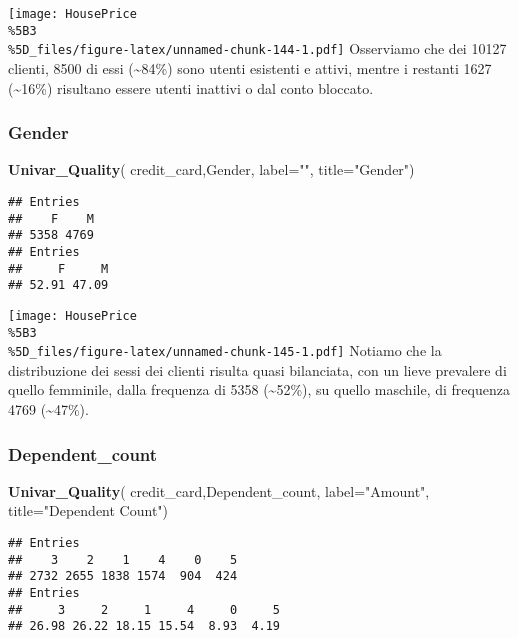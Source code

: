 \documentclass[
]{article}
\newenvironment{Shaded}{\begin{snugshade}}{\end{snugshade}}
\newcommand{\AttributeTok}[1]{\textcolor[rgb]{0.13,0.29,0.53}{#1}}
\newcommand{\FunctionTok}[1]{\textcolor[rgb]{0.13,0.29,0.53}{\textbf{#1}}}
\newcommand{\NormalTok}[1]{#1}
\newcommand{\StringTok}[1]{\textcolor[rgb]{0.31,0.60,0.02}{#1}}
\begin{document}
\texttt{[image: HousePrice\\\%5B3\\\%5D\_files/figure-latex/unnamed-chunk-144-1.pdf]}
Osserviamo che dei 10127 clienti, 8500 di essi (\textasciitilde84\%)
sono utenti esistenti e attivi, mentre i restanti 1627
(\textasciitilde16\%) risultano essere utenti inattivi o dal conto
bloccato.

\subsubsection{Gender}\label{gender}

\begin{Shaded}
\begin{Highlighting}[]
\FunctionTok{Univar\_Quality}\NormalTok{(}
\NormalTok{  credit\_card,Gender,}
  \AttributeTok{label=}\StringTok{""}\NormalTok{,}
  \AttributeTok{title=}\StringTok{"Gender"}\NormalTok{)}
\end{Highlighting}
\end{Shaded}

\begin{verbatim}
## Entries
##    F    M 
## 5358 4769 
## Entries
##     F     M 
## 52.91 47.09
\end{verbatim}

\texttt{[image: HousePrice\\\%5B3\\\%5D\_files/figure-latex/unnamed-chunk-145-1.pdf]}
Notiamo che la distribuzione dei sessi dei clienti risulta quasi
bilanciata, con un lieve prevalere di quello femminile, dalla frequenza
di 5358 (\textasciitilde52\%), su quello maschile, di frequenza 4769
(\textasciitilde47\%).

\subsubsection{Dependent\_count}\label{dependent_count}

\begin{Shaded}
\begin{Highlighting}[]
\FunctionTok{Univar\_Quality}\NormalTok{(}
\NormalTok{  credit\_card,Dependent\_count,}
  \AttributeTok{label=}\StringTok{"Amount"}\NormalTok{,}
  \AttributeTok{title=}\StringTok{"Dependent Count"}\NormalTok{)}
\end{Highlighting}
\end{Shaded}

\begin{verbatim}
## Entries
##    3    2    1    4    0    5 
## 2732 2655 1838 1574  904  424 
## Entries
##     3     2     1     4     0     5 
## 26.98 26.22 18.15 15.54  8.93  4.19
\end{verbatim}
\end{document}
